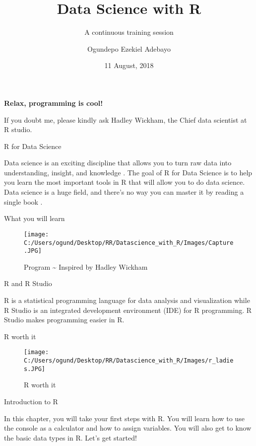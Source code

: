 \documentclass[ignorenonframetext,]{beamer}
\title{Data Science with R}
\subtitle{A continuous training session}
\author{Ogundepo Ezekiel Adebayo}
\date{11 August, 2018}
\begin{document}
\frame{\titlepage}

\begin{frame}

\begin{center}
\textbf{Relax, programming is cool!}
\end{center}

If you doubt me, please kindly ask Hadley Wickham, the Chief data
scientist at R studio.

\end{frame}

\begin{frame}{R for Data Science}

Data science is an exciting discipline that allows you to turn raw data
into understanding, insight, and knowledge \cite{P}. The goal of R for
Data Science is to help you learn the most important tools in R that
will allow you to do data science. Data science is a huge field, and
there's no way you can master it by reading a single book \cite{P}.

\end{frame}

\begin{frame}{What you will learn}

\begin{figure}
\centering
\texttt{[image: C:/Users/ogund/Desktop/RR/Datascience\_with\_R/Images/Capture.JPG]}
\caption{Program \textasciitilde{} Inspired by Hadley Wickham \cite{P}}
\end{figure}

\begin{block}{R and R Studio}

R is a statistical programming language for data analysis and
visualization while R Studio is an integrated development environment
(IDE) for R programming. R Studio makes programming easier in R.

\end{block}

\end{frame}

\begin{frame}{R worth it}

\begin{figure}
\centering
\texttt{[image: C:/Users/ogund/Desktop/RR/Datascience\_with\_R/Images/r\_ladies.JPG]}
\caption{R worth it}
\end{figure}

\end{frame}

\begin{frame}{Introduction to R}

In this chapter, you will take your first steps with R. You will learn
how to use the console as a calculator and how to assign variables. You
will also get to know the basic data types in R. Let's get started!

\end{frame}
\end{document}
